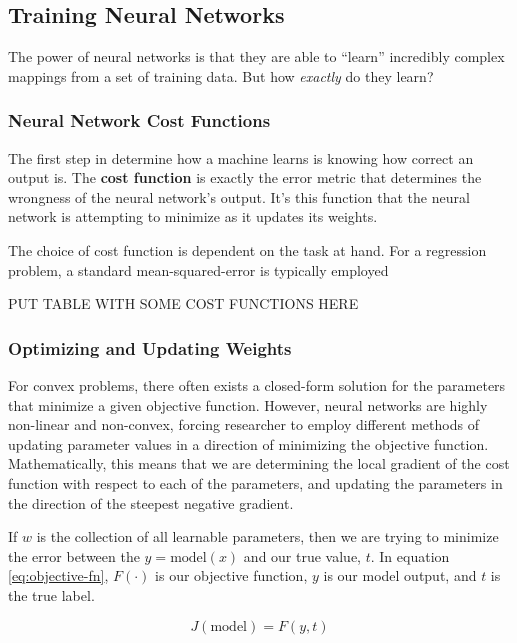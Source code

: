 \subsection{Training Neural Networks}

The power of neural networks is that they are able to ``learn'' incredibly complex mappings from a set of training data. But how \emph{exactly} do they learn?

\subsubsection{Neural Network Cost Functions}

The first step in determine how a machine learns is knowing how correct an output is. The {\bf cost function} is exactly the error metric that determines the wrongness of the neural network's output. It's this function that the neural network is attempting to minimize as it updates its weights.

The choice of cost function is dependent on the task at hand. For a regression problem, a standard mean-squared-error is typically employed 

\begin{center}
    \Huge{PUT TABLE WITH SOME COST FUNCTIONS HERE}
\end{center}

\subsubsection{Optimizing and Updating Weights}

For convex problems, there often exists a closed-form solution for the parameters that minimize a given objective function. However, neural networks are highly non-linear and non-convex, forcing researcher to employ different methods of updating parameter values in a direction of minimizing the objective function. Mathematically, this means that we are determining the local gradient of the cost function with respect to each of the parameters, and updating the parameters in the direction of the steepest negative gradient.

If $w$ is the collection of all learnable parameters, then we are trying to minimize the error between the $y = \text{model}(x)$ and our true value, $t$. In equation \ref{eq:objective-fn}, $F(\cdot)$ is our objective function, $y$ is our model output, and $t$ is the true label.

\begin{equation}
    J(\text{model}) = F(y,t)
    \label{eq:objective-fn}
\end{equation}

